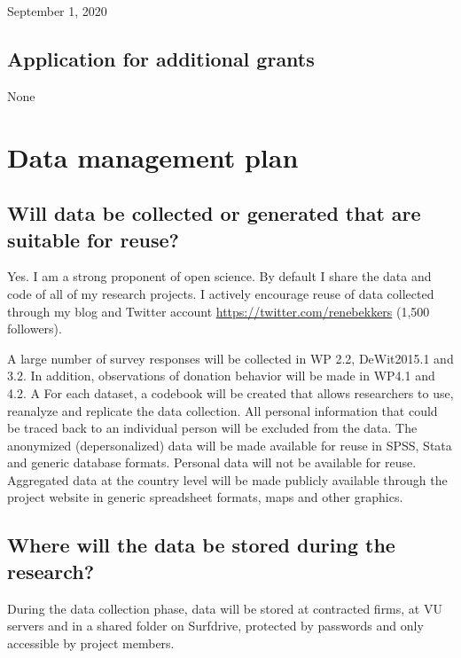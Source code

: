 \documentclass[twocolumn, serif, rga, numeric]{jote-article}
\begin{document}
September 1, 2020 
 {}\subsection*{Application for additional grants} 

None 
 {}\section*{Data management plan} 

 {}\subsection*{Will data be collected or generated that are suitable for reuse?} 

Yes. I am a strong proponent of open science. By default I share the data and code of all of my research projects. I actively encourage reuse of data collected through my blog and Twitter account \url{https://twitter.com/renebekkers} (1,500 followers).

A large number of survey responses will be collected in WP 2.2, DeWit2015.1 and 3.2. In addition, observations of donation behavior will be made in WP4.1 and 4.2. A For each dataset, a codebook will be created that allows researchers to use, reanalyze and replicate the data collection.
All personal information that could be traced back to an individual person will be excluded from the data. The anonymized (depersonalized) data will be made available for reuse in SPSS, Stata and generic database formats. Personal data will not be available for reuse.
Aggregated data at the country level will be made publicly available through the project website in generic spreadsheet formats, maps and other graphics.

 {}\subsection*{Where will the data be stored during the research?} 

During the data collection phase, data will be stored at contracted firms, at VU servers and in a shared folder on Surfdrive, protected by passwords and only accessible by project members.
\end{document}
